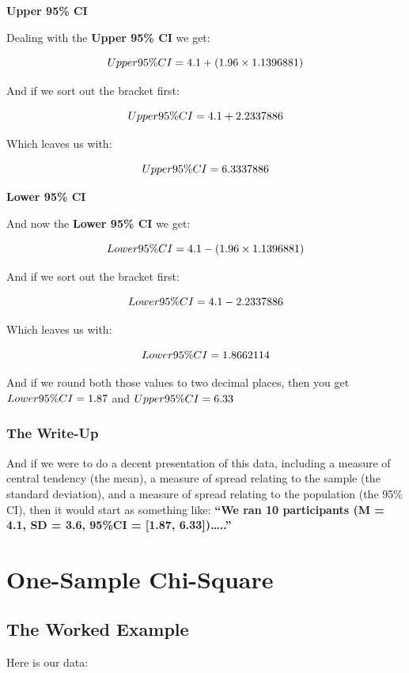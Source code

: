 \documentclass[
  oneside]{book}
\begin{document}
\textbf{Upper 95\% CI}

Dealing with the \textbf{Upper 95\% CI} we get:

\[Upper \space 95\%CI = 4.1 + (1.96 \times 1.1396881)\]

And if we sort out the bracket first:

\[Upper \space 95\%CI = 4.1 + 2.2337886\]

Which leaves us with:

\[Upper \space 95\%CI = 6.3337886\]

\textbf{Lower 95\% CI}

And now the \textbf{Lower 95\% CI} we get:

\[Lower \space 95\%CI = 4.1 - (1.96 \times 1.1396881)\]

And if we sort out the bracket first:

\[Lower \space 95\%CI = 4.1 - 2.2337886\]

Which leaves us with:

\[Lower \space 95\%CI = 1.8662114\]

And if we round both those values to two decimal places, then you get \textbf{\(Lower \space 95\%CI = 1.87\)} and \textbf{\(Upper \space 95\%CI = 6.33\)}

\hypertarget{the-write-up}{%
\subsection{The Write-Up}\label{the-write-up}}

And if we were to do a decent presentation of this data, including a measure of central tendency (the mean), a measure of spread relating to the sample (the standard deviation), and a measure of spread relating to the population (the 95\% CI), then it would start as something like: \textbf{``We ran 10 participants (M = 4.1, SD = 3.6, 95\%CI = {[}1.87, 6.33{]})\ldots..''}

\hypertarget{one-sample-chi-square}{%
\chapter{One-Sample Chi-Square}\label{one-sample-chi-square}}

\hypertarget{the-worked-example}{%
\section{The Worked Example}\label{the-worked-example}}

Here is our data:
\end{document}
